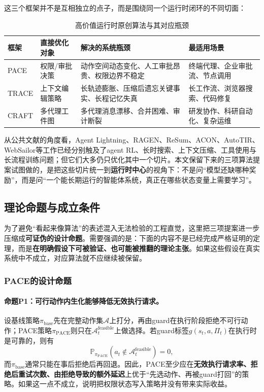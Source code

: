 \documentclass[12pt,a4paper]{article}
\begin{document}
这三个框架并不是互相独立的点子，而是围绕同一个运行时闭环的不同切面：

\begin{table}[H]
\centering
\caption{高价值运行时原创算法与其对应瓶颈}
\begin{tabular}{p{2.3cm}p{3.2cm}p{4.2cm}p{3.0cm}}
\toprule
\textbf{框架} & \textbf{直接优化对象} & \textbf{解决的系统瓶颈} & \textbf{最适用场景} \\
\midrule
PACE & 权限/审批决策 & 动作空间动态变化、人工审批昂贵、权限边界不稳定 & 终端代理、企业审批流、节点调用 \\
TRACE & 上下文编辑策略 & 长轨迹膨胀、压缩后遗忘关键事实、长程记忆失真 & 长工作流、浏览器搜索、代码修复 \\
CRAFT & 多代理工件图 & 多代理消息漂移、合并困难、审计断裂 & 研发协作、科研自动化、复杂运维 \\
\bottomrule
\end{tabular}
\end{table}

从公共文献的角度看，Agent Lightning、RAGEN、ReSum、ACON、AutoTIR、WebSailor等工作已经分别触及了agent RL、长时搜索、上下文压缩、工具使用与长流程训练问题；但它们大多仍只优化其中一个切片。本文保留下来的三项算法提案试图做的，是把这些切片统一到\textbf{运行时中心}的视角下：不是问“模型还缺哪种奖励”，而是问“一个能长期运行的智能体系统，真正在哪些状态变量上需要学习”。

\subsection{理论命题与成立条件}

为了避免“看起来像算法”的表述混入无法检验的工程直觉，这里把三项提案进一步压缩成\textbf{可证伪的设计命题}。需要强调的是：下面的内容不是已经完成严格证明的定理，而是\textbf{在明确假设下可被验证、也可能被推翻的理论主张}。如果这些假设在真实系统中不成立，对应算法就不应继续被保留。

\subsubsection{PACE的设计命题}

\paragraph{命题P1：可行动作内生化能够降低无效执行请求。}
设基线策略$\pi_{\text{base}}$先在完整动作集$\mathcal{A}$上打分，再由guard在执行阶段拒绝不可行动作；PACE策略$\pi_{\text{PACE}}$则只在$\mathcal{A}^{\text{feasible}}_t$上做选择。若guard标签$g(s_t,a,\Pi_t)$在执行时是可靠的，则有
\begin{equation}
\mathbb{P}_{\pi_{\text{PACE}}}\!\left(a_t \notin \mathcal{A}^{\text{feasible}}_t\right)=0,
\end{equation}
而$\pi_{\text{base}}$通常只能在事后拒绝后再回退。因此，PACE至少应在\textbf{无效执行请求率、拒绝后重试次数、由拒绝导致的额外延迟}上优于“先选动作、再被guard打回”的策略。如果这一点不成立，说明把权限状态写入策略并没有带来实际收益。
\end{document}
